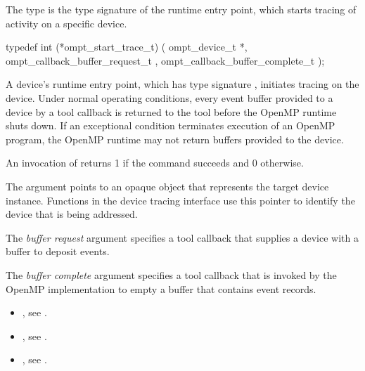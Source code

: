 \summary
The  type is the type signature of the 
 runtime entry point, which starts tracing 
of activity on a specific device.

\format
\begin{ccppspecific}
\begin{omptInquiry}
typedef int (*ompt_start_trace_t) (
  ompt_device_t *,
  ompt_callback_buffer_request_t ,
  ompt_callback_buffer_complete_t 
);
\end{omptInquiry}
\end{ccppspecific}

\descr
A device's  runtime entry point, which has type
signature , initiates tracing on the device.
Under normal operating conditions, every event buffer provided to a 
device by a tool callback is returned to the tool before the OpenMP 
runtime shuts down. If an exceptional condition terminates  execution 
of an OpenMP program, the OpenMP runtime may not return buffers provided 
to the device.

An invocation of  returns 1 if the command
succeeds and 0 otherwise.

\argdesc
The  argument points to an opaque object that represents
the target device instance. Functions in the device tracing interface
use this pointer to identify the device that is being addressed.

The \emph{buffer request} argument specifies a tool callback that supplies
a device with a buffer to deposit events.

The \emph{buffer complete} argument specifies a tool callback that is invoked 
by the OpenMP implementation to empty a buffer that contains event records.

\crossreferences
\begin{itemize}
\item {}, see .

\item {}, 
see .

\item {}, 
see .
\end{itemize}



\label{sec:ompt_pause_trace_t}

